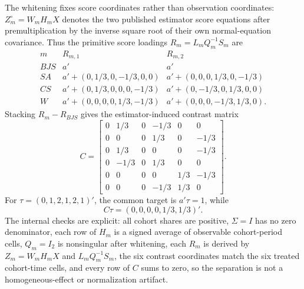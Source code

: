 \documentclass[11pt]{article}
\theoremstyle{definition}
\theoremstyle{plain}
\theoremstyle{remark}
\begin{document}
The whitening fixes score coordinates rather than observation coordinates: \(Z_m^{\circ}=W_mH_mX\) denotes the two published estimator score equations after premultiplication by the inverse square root of their own normal-equation covariance. Thus the primitive score loadings \(R_m=L_mQ_m^{-1}S_m\) are
\[
\begin{array}{c|cc}
m & R_{m,1} & R_{m,2}\\ \hline
BJS & a' & a'\\
SA & a'+(0,1/3,0,-1/3,0,0) & a'+(0,0,0,1/3,0,-1/3)\\
CS & a'+(0,1/3,0,0,0,-1/3) & a'+(0,-1/3,0,1/3,0,0)\\
W & a'+(0,0,0,0,1/3,-1/3) & a'+(0,0,0,-1/3,1/3,0).
\end{array}
\]
Stacking \(R_m-R_{BJS}\) gives the estimator-induced contrast matrix
\[
C=\begin{bmatrix}
0&1/3&0&-1/3&0&0\\
0&0&0&1/3&0&-1/3\\
0&1/3&0&0&0&-1/3\\
0&-1/3&0&1/3&0&0\\
0&0&0&0&1/3&-1/3\\
0&0&0&-1/3&1/3&0
\end{bmatrix}.
\]
For \(\tau=(0,1,2,1,2,1)'\), the common target is \(a'\tau=1\), while
\[
C\tau=(0,0,0,0,1/3,1/3)' .
\]
The internal checks are explicit: all cohort shares are positive, \(\Sigma=I\) has no zero denominator, each row of \(H_m\) is a signed average of observable cohort-period cells, \(Q_m=I_2\) is nonsingular after whitening, each \(R_m\) is derived by \(Z_m=W_mH_mX\) and \(L_mQ_m^{-1}S_m\), the six contrast coordinates match the six treated cohort-time cells, and every row of \(C\) sums to zero, so the separation is not a homogeneous-effect or normalization artifact.
\end{document}
